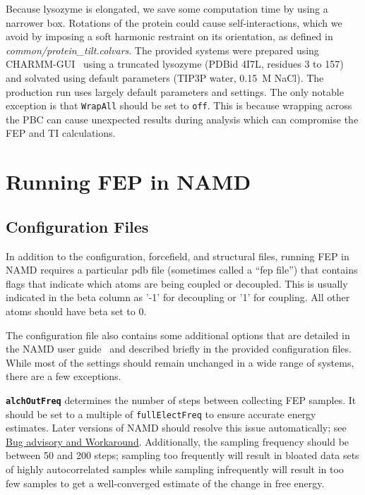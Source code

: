 \documentclass[9pt,tutorial,pubversion]{Styling/livecoms}
\newcommand{\filepath}[1]{\textit{#1}}
\newcommand{\textInput}[1]{\texttt{#1}}
\begin{document}
Because lysozyme is elongated, we save some computation time by using a narrower box. Rotations of the protein could cause self-interactions, which we avoid by imposing a soft harmonic restraint on its orientation, as defined in \filepath{common/protein\_tilt.colvars}. \label{app:equilibration}
The provided systems were prepared using CHARMM-GUI~\cite{Jo2008, Lee2016} using a truncated lysozyme (PDBid 4I7L, residues 3 to 157) and solvated using default parameters (TIP3P water, 0.15~M NaCl). 
The production run uses largely default parameters and settings. The only notable exception is that \textInput{WrapAll} should be set to \textInput{off}. 
This is because wrapping across the PBC can cause unexpected results during analysis which can compromise the FEP and TI calculations.

\section{Running FEP in NAMD}\label{app:FEPparameters}
\subsection{Configuration Files}
In addition to the configuration, forcefield, and structural files, running FEP in NAMD requires a particular pdb file (sometimes called a ``fep file'') that contains flags that indicate which atoms are being coupled or decoupled. This is usually indicated in the beta column as '-1' for decoupling or '1' for coupling. All other atoms should have beta set to 0.

The configuration file also contains some additional options that are detailed in the NAMD user guide~\cite{Bernardi2020} and described briefly in the provided configuration files. While most of the settings should remain unchanged in a wide range of systems, there are a few exceptions.

\textbf{\textInput{alchOutFreq}} determines the number of steps between collecting FEP samples. It should be set to a multiple of \textInput{fullElectFreq} to ensure accurate energy estimates. Later versions of NAMD should resolve this issue automatically; see \href{https://www.ks.uiuc.edu/Research/namd/mailing_list/namd-l.2020-2021/1487.html}{Bug advisory and Workaround}. Additionally, the sampling frequency should be between 50 and 200 steps; sampling too frequently will result in bloated data sets of highly autocorrelated samples while sampling infrequently will result in too few samples to get a well-converged estimate of the change in free energy.
\end{document}
